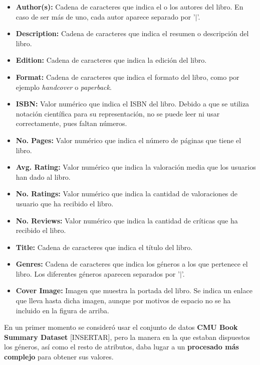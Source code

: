 \documentclass[12pt,a4paper, xcolor=table]{article}
\begin{document}
    \begin{itemize}
        \item \textbf{Author(s):} Cadena de caracteres que indica el o los autores del libro. En caso de ser más de uno, cada autor aparece separado por '$\mid$'.
        \item \textbf{Description:} Cadena de caracteres que indica el resumen o descripción del libro.
        \item \textbf{Edition:} Cadena de caracteres que indica la edición del libro.
        \item \textbf{Format:} Cadena de caracteres que indica el formato del libro, como por ejemplo \textit{handcover} o \textit{paperback}.
        \item \textbf{ISBN:} Valor numérico que indica el ISBN del libro. Debido a que se utiliza notación científica para su representación, no se puede leer ni usar correctamente, pues faltan números.
        \item \textbf{No. Pages:} Valor numérico que indica el número de páginas que tiene el libro.
        \item \textbf{Avg. Rating:} Valor numérico que indica la valoración media que los usuarios han dado al libro.
        \item \textbf{No. Ratings:}  Valor numérico que indica la cantidad de valoraciones de usuario que ha recibido el libro.
        \item \textbf{No. Reviews:} Valor numérico que indica la cantidad de críticas que ha recibido el libro.
        \item \textbf{Title:} Cadena de caracteres que indica el título del libro.
        \item \textbf{Genres:} Cadena de caracteres que indica los géneros a los que pertenece el libro. Los diferentes géneros aparecen separados por '$\mid$'.
        \item \textbf{Cover Image:} Imagen que muestra la portada del libro. Se indica un enlace que lleva hasta dicha imagen, aunque por motivos de espacio no se ha incluido en la figura de arriba.
    \end{itemize}

    \vspace{3mm}

    En un primer momento se consideró usar el conjunto de datos \textbf{CMU Book Summary Dataset} [INSERTAR], pero la manera en la que estaban dispuestos los géneros, así como el resto de atributos, daba lugar a un \textbf{procesado más complejo} para obtener sus valores.
\end{document}
